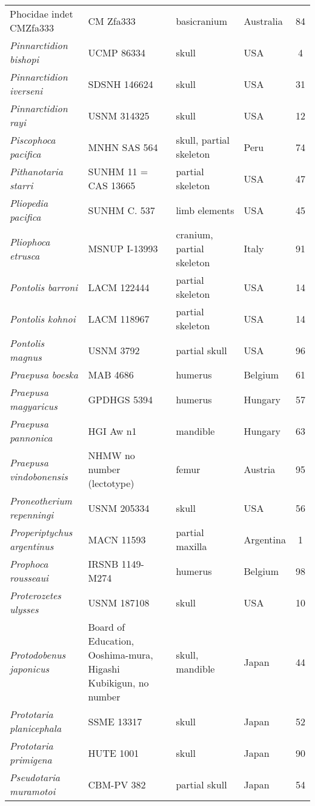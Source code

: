 \begin{longtable}{p{}p{}p{}lc}
Phocidae indet CMZfa333	& CM Zfa333 & 	basicranium & 	Australia & 84\\
\textit{Pinnarctidion bishopi} &	UCMP 86334 & 	skull & 	USA & 4\\
\textit{Pinnarctidion iverseni} &	SDSNH 146624 & 	skull & 	USA & 31\\
\textit{Pinnarctidion rayi} &	USNM 314325 & 	skull & 	USA & 12\\
\textit{Piscophoca pacifica} &	MNHN SAS 564 & 	skull, partial skeleton	 & Peru & 74\\
\textit{Pithanotaria starri} &	SUNHM 11 = CAS 13665 & 	partial skeleton & 	USA & 47\\
\textit{Pliopedia pacifica} &	SUNHM C. 537 & 	limb elements & 	USA & 45\\
\textit{Pliophoca etrusca} &	MSNUP I-13993 & 	cranium, partial skeleton & 	Italy & 91\\
\textit{Pontolis barroni} &	LACM 122444 & 	partial skeleton & 	USA & 14\\
\textit{Pontolis kohnoi} &	LACM 118967 & 	partial skeleton & 	USA & 14\\
\textit{Pontolis magnus} &	USNM 3792 & 	partial skull & 	USA & 96\\
\textit{Praepusa boeska} &	MAB 4686 & 	humerus & 	Belgium & 	61\\
\textit{Praepusa magyaricus} &	GPDHGS 5394 & 	humerus & 	Hungary & 57\\
\textit{Praepusa pannonica} &	HGI Aw n1 & 	mandible & 	Hungary & 63\\
\textit{Praepusa vindobonensis} &	NHMW no number (lectotype) & 	femur & 	Austria & 95\\
\textit{Proneotherium repenningi} &	USNM 205334 & 	skull & 	USA & 56\\
\textit{Properiptychus argentinus} &	MACN 11593 & 	partial maxilla & 	Argentina & 1\\
\textit{Prophoca rousseaui} &	IRSNB 1149-M274 & 	humerus	 & Belgium	& 98\\
\textit{Proterozetes ulysses} &	USNM 187108 & 	skull & 	USA	 & 10\\
\textit{Protodobenus japonicus} & Board of Education, Ooshima-mura, Higashi Kubikigun, no number & 	skull, mandible & 	Japan & 44\\
\textit{Prototaria planicephala} &	SSME 13317 & 	skull & 	Japan & 52\\
\textit{Prototaria primigena} &	HUTE 1001 & 	skull & 	Japan & 90\\
\textit{Pseudotaria muramotoi} &	CBM-PV 382 & 	partial skull & 	Japan & 54\\

\end{longtable}
